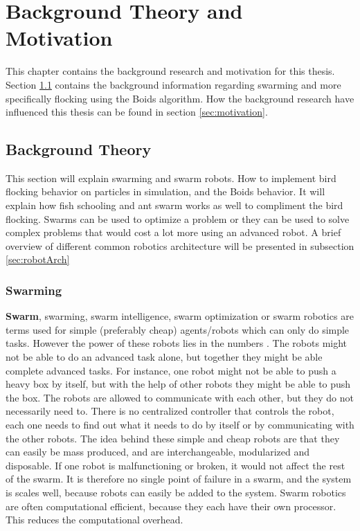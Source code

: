 \chapter{Background Theory and Motivation}
\label{cha:TheoryAndBackground}
This chapter contains the background research and motivation for this thesis.
Section \ref{sec:background} contains the background information regarding swarming and more specifically flocking using the Boids algorithm. How the background research have influenced this thesis can be found in section \ref{sec:motivation}.

\section{Background Theory}
\label{sec:background}
This section will explain swarming and swarm robots. How to implement bird flocking behavior on particles in simulation, and the Boids behavior. It will explain how fish schooling and ant swarm works as well to compliment the bird flocking. Swarms can be used to optimize a problem or they can be used to solve complex problems that would cost a lot more using an advanced robot.
A brief overview of different common robotics architecture will be presented in subsection \ref{sec:robotArch}

\subsection{Swarming}
\textbf{Swarm}, swarming, swarm intelligence, swarm optimization or swarm robotics are terms used for simple (preferably cheap) agents/robots which can only do simple tasks. However the power of these robots lies in the numbers \citep{Zhu2010,Bonabeau1999}. The robots might not be able to do an advanced task alone, but together they might be able complete advanced tasks. For instance, one robot might not be able to push a heavy box by itself, but with the help of other robots they might be able to push the box.
The robots are allowed to communicate with each other, but they do not necessarily need to. There is no centralized controller that controls the robot, each one needs to find out what it needs to do by itself or by communicating with the other robots. The idea behind these simple and cheap robots are that they can easily be mass produced, and are interchangeable, modularized and disposable. If one robot is malfunctioning or broken, it would not affect the rest of the swarm. It is therefore no single point of failure in a swarm, and the system is scales well, because robots can easily be added to the system.
Swarm robotics are often computational efficient, because they each have their own processor. This reduces the computational overhead. 

